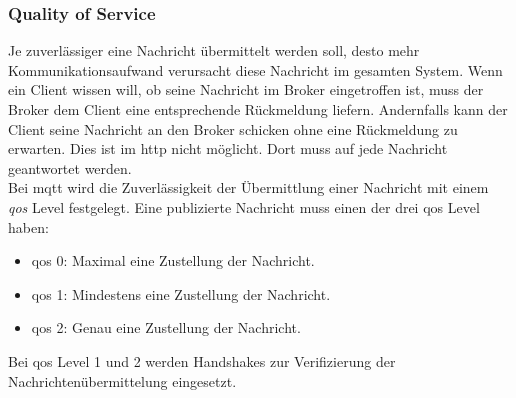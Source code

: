 \subsubsection{Quality of Service} \label{s:qos}
Je zuverlässiger eine Nachricht übermittelt werden soll, desto mehr Kommunikationsaufwand verursacht diese Nachricht im gesamten System.
Wenn ein Client wissen will, ob seine Nachricht im Broker eingetroffen ist, muss der Broker dem Client eine entsprechende Rückmeldung liefern. Andernfalls kann der Client seine Nachricht an den Broker schicken ohne eine Rückmeldung zu erwarten. Dies ist im \ac{http} nicht möglicht. Dort muss auf jede Nachricht geantwortet werden.\\
Bei \ac{mqtt} wird die Zuverlässigkeit der Übermittlung einer Nachricht mit einem \textit{\acf{qos}} Level festgelegt. Eine publizierte Nachricht muss einen der drei \ac{qos} Level haben:
\begin{itemize}
    \item \ac{qos} 0: Maximal eine Zustellung der Nachricht.
    \item \ac{qos} 1: Mindestens eine Zustellung der Nachricht.
    \item \ac{qos} 2: Genau eine Zustellung der Nachricht.
\end{itemize}
Bei \ac{qos} Level 1 und 2 werden Handshakes zur Verifizierung der Nachrichtenübermittelung eingesetzt.\cite{mqtt5Specification}

